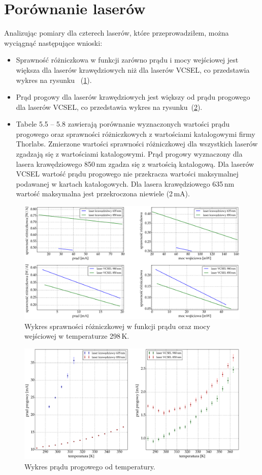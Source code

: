 \section{Porównanie laserów}
Analizując pomiary dla czterech laserów, które przeprowadziłem, można wyciągnąć następujące wnioski:
\begin{itemize}
\item Sprawność różniczkowa w funkcji zarówno prądu i mocy wejściowej jest większa dla laserów krawędziowych niż dla laserów
VCSEL, co przedstawia wykres na rysunku ~(\ref{fig:plot_eff}).
\item Prąd progowy dla laserów krawędziowych jest większy od prądu progowego dla laserów VCSEL, co przedstawia wykres
na rysunku~(\ref{fig:plot_temp_i_th}).
\item Tabele 5.5 -- 5.8 zawierają porównanie wyznaczonych wartości prądu progowego oraz sprawności różniczkowych z wartościami katalogowymi
firmy Thorlabs. Zmierzone wartości sprawności różniczkowej dla wszystkich laserów zgadzają się z wartościami katalogowymi.
Prąd progowy wyznaczony dla lasera krawędziowego 850\,nm zgadza się z wartością katalogową.
Dla laserów VCSEL wartość prądu progowego nie przekracza wartości maksymalnej podawanej w kartach katalogowych.
Dla lasera krawędziowego 635\,nm wartość maksymalna jest przekroczona niewiele (2\,mA).
\end{itemize}
\newpage
\begin{figure}
\center
  \includegraphics[scale=0.30]{plot_common/plot_eff.eps}
  \caption{Wykres sprawności różniczkowej w funkcji prądu oraz mocy wejściowej w temperaturze 298\,K.}
  \label{fig:plot_eff}
\end{figure}
\begin{figure}[H]
\center
  \includegraphics[scale=0.30]{plot_common/plot_temp_i_th.eps}
  \caption{Wykres prądu progowego od temperatury.}
  \label{fig:plot_temp_i_th}
\end{figure}
